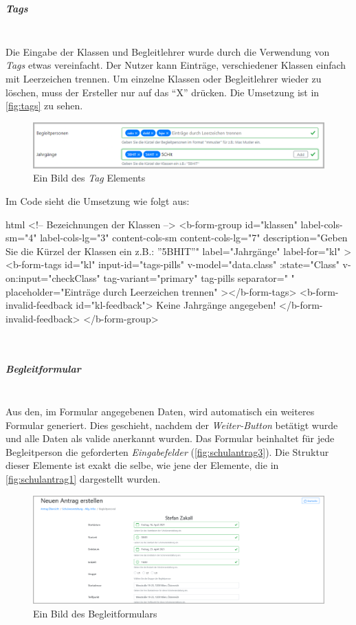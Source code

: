 	\label{list:bspinputgroup} ~\\
\subparagraph{Tags}~\\
Die Eingabe der Klassen und Begleitlehrer wurde durch die Verwendung von \textit{Tags} etwas vereinfacht. Der Nutzer kann Einträge, verschiedener Klassen einfach mit Leerzeichen trennen. Um einzelne Klassen oder Begleitlehrer wieder zu löschen, muss der Ersteller nur auf das \enquote{X} drücken. Die Umsetzung ist in \autoref{fig:tags} zu sehen.
\begin{figure}[H]
	\centering
	\includegraphics[width=0.8\linewidth]{images/ldehner_implementierung/tags}
	\caption[Tags]{Ein Bild des \textit{Tag} Elements}
	\label{fig:tags}
\end{figure}
Im Code sieht die Umsetzung wie folgt aus:
\begin{code}{html}
<!-- Bezeichnungen der Klassen -->
<b-form-group
	id="klassen"
	label-cols-sm="4"
	label-cols-lg="3"
	content-cols-sm
	content-cols-lg="7"
	description="Geben Sie die Kürzel der Klassen ein z.B.: ''5BHIT''"
	label="Jahrgänge"
	label-for="kl"
>
	<b-form-tags
		id="kl"
		input-id="tags-pills"
		v-model="data.class"
		:state="Class"
		v-on:input="checkClass"
		tag-variant="primary"
		tag-pills
		separator=" "
		placeholder="Einträge durch Leerzeichen trennen"
	></b-form-tags>
	<b-form-invalid-feedback id="kl-feedback">
		Keine Jahrgänge angegeben!
	</b-form-invalid-feedback>
</b-form-group>
\end{code}
\label{list:tags} ~\\
\subparagraph{Begleitformular}~\\
Aus den, im Formular angegebenen Daten, wird automatisch ein weiteres Formular generiert. Dies geschieht, nachdem der \textit{Weiter-Button} betätigt wurde und alle Daten als valide anerkannt wurden. Das Formular beinhaltet für jede Begleitperson die geforderten \textit{Eingabefelder} (\autoref{fig:schulantrag3}). Die Struktur dieser Elemente ist exakt die selbe, wie jene der Elemente, die in \autoref{fig:schulantrag1} dargestellt wurden. 
\begin{figure}[H]
	\centering
	\includegraphics[width=1\linewidth]{images/ldehner_implementierung/schul_3_1}
	\caption[Begleitformular]{Ein Bild des Begleitformulars}
	\label{fig:schulantrag3}
\end{figure}
